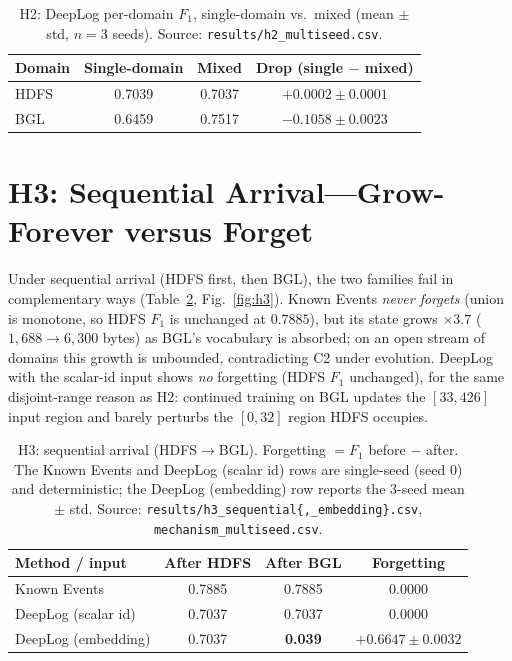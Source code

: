 \documentclass[journal]{IEEEtran}
\begin{document}
\begin{table}[t]
\caption{H2: DeepLog per-domain $F_1$, single-domain vs.\ mixed (mean $\pm$ std, $n=3$ seeds).
Source: \texttt{results/h2\_multiseed.csv}.}
\label{tab:h2}
\centering
\begin{tabular}{@{}lccc@{}}
\toprule
Domain & Single-domain & Mixed & Drop (single $-$ mixed) \\
\midrule
HDFS & 0.7039 & 0.7037 & $+0.0002\pm0.0001$ \\
BGL  & 0.6459 & 0.7517 & $-0.1058\pm0.0023$ \\
\bottomrule
\end{tabular}
\end{table}

\section{H3: Sequential Arrival---Grow-Forever versus Forget}\label{sec:h3}
Under sequential arrival (HDFS first, then BGL), the two families fail in complementary ways
(Table~\ref{tab:h3}, Fig.~\ref{fig:h3}). Known Events \emph{never forgets} (union is monotone, so
HDFS $F_1$ is unchanged at $0.7885$), but its state grows $\times3.7$ ($1{,}688\rightarrow6{,}300$
bytes) as BGL's vocabulary is absorbed; on an open stream of domains this growth is unbounded,
contradicting C2 under evolution. DeepLog with the scalar-id input shows \emph{no} forgetting (HDFS
$F_1$ unchanged), for the same disjoint-range reason as H2: continued training on BGL updates the
$[33,426]$ input region and barely perturbs the $[0,32]$ region HDFS occupies.

\begin{table}[t]
\caption{H3: sequential arrival (HDFS$\rightarrow$BGL). Forgetting $=F_1$ before $-$ after.
The Known Events and DeepLog (scalar id) rows are single-seed (seed 0) and deterministic; the
DeepLog (embedding) row reports the 3-seed mean $\pm$ std.
Source: \texttt{results/h3\_sequential\{,\_embedding\}.csv}, \texttt{mechanism\_multiseed.csv}.}
\label{tab:h3}
\centering
\begin{tabular}{@{}lccc@{}}
\toprule
Method / input & After HDFS & After BGL & Forgetting \\
\midrule
Known Events         & 0.7885 & 0.7885 & 0.0000 \\
DeepLog (scalar id)  & 0.7037 & 0.7037 & 0.0000 \\
DeepLog (embedding)  & 0.7037 & \textbf{0.039} & $\mathbf{+0.6647 \pm 0.0032}$ \\
\bottomrule
\end{tabular}
\end{table}
\end{document}
